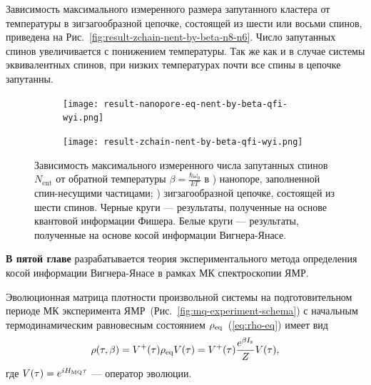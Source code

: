 Зависимость максимального измеренного размера запутанного кластера от температуры в зигзагообразной цепочке,
состоящей из шести или восьми спинов, приведена на Рис.~\ref{fig:result-zchain-nent-by-beta-n8-n6}.
Число запутанных спинов увеличивается с понижением температуры.
Так же как и в случае системы эквивалентных спинов,
при низких температурах почти все спины в цепочке запутанны.


\begin{figure}[H]
  \centering
  \begin{subfigure}[t]{0.49\textwidth}
    \texttt{[image: result-nanopore-eq-nent-by-beta-qfi-wyi.png]}
	\caption{}
	\label{fig:result-nanopore-eq-nent-by-beta-qfi-wyi}
  \end{subfigure}
  \hfill
  \begin{subfigure}[t]{0.49\textwidth}
    \texttt{[image: result-zchain-nent-by-beta-qfi-wyi.png]}
	\caption{}
	\label{fig:result-zchain-nent-by-beta-qfi-wyi}
  \end{subfigure}
  \caption{
    Зависимость максимального измеренного числа запутанных спинов~$N_\mathrm{ent}$
	от обратной температуры $\beta = \frac{\hbar \omega_0}{kT}$
    в ) нанопоре, заполненной спин-несущими частицами;
    ) зигзагообразной цепочке, состоящей из шести спинов.
	Черные круги --- результаты, полученные на основе квантовой информации Фишера.
	Белые круги --- результаты, полученные на основе косой информации Вигнера-Янасе.
  }
  \label{fig:result-nent-by-beta-qfi-wyi}
\end{figure}

\textbf{В пятой главе} разрабатывается теория экспериментального метода определения косой информации Вигнера-Янасе в рамках МК спектроскопии ЯМР.

Эволюционная матрица плотности произвольной системы на
подготовительном периоде МК эксперимента ЯМР~(Рис.~\ref{fig:mq-experiment-schema})
с начальным термодинамическим равновесным состоянием $\rho_\mathrm{eq}$~(\ref{eq:rho-eq}) имеет вид
%
\begin{equation}\label{eq:rho-eval}
  \rho(\tau,\beta)
  = V^+(\tau) \rho_\mathrm{eq} V(\tau)
  = V^+(\tau) \frac{e^{\beta I_\mathrm{z}}}{Z} V(\tau),
\end{equation}
%
где $V(\tau) = e^{iH_\mathrm{MQ}\tau}$
---  оператор эволюции.

